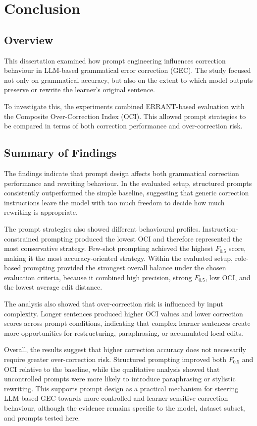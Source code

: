 \chapter{Conclusion}

\section{Overview}

This dissertation examined how prompt engineering influences correction behaviour in LLM-based grammatical error correction (GEC). The study focused not only on grammatical accuracy, but also on the extent to which model outputs preserve or rewrite the learner's original sentence.

To investigate this, the experiments combined ERRANT-based evaluation with the Composite Over-Correction Index (OCI). This allowed prompt strategies to be compared in terms of both correction performance and over-correction risk.

\section{Summary of Findings}

The findings indicate that prompt design affects both grammatical correction performance and rewriting behaviour. In the evaluated setup, structured prompts consistently outperformed the simple baseline, suggesting that generic correction instructions leave the model with too much freedom to decide how much rewriting is appropriate.

The prompt strategies also showed different behavioural profiles. Instruction-constrained prompting produced the lowest OCI and therefore represented the most conservative strategy. Few-shot prompting achieved the highest $F_{0.5}$ score, making it the most accuracy-oriented strategy. Within the evaluated setup, role-based prompting provided the strongest overall balance under the chosen evaluation criteria, because it combined high precision, strong $F_{0.5}$, low OCI, and the lowest average edit distance.

The analysis also showed that over-correction risk is influenced by input complexity. Longer sentences produced higher OCI values and lower correction scores across prompt conditions, indicating that complex learner sentences create more opportunities for restructuring, paraphrasing, or accumulated local edits.

Overall, the results suggest that higher correction accuracy does not necessarily require greater over-correction risk. Structured prompting improved both $F_{0.5}$ and OCI relative to the baseline, while the qualitative analysis showed that uncontrolled prompts were more likely to introduce paraphrasing or stylistic rewriting. This supports prompt design as a practical mechanism for steering LLM-based GEC towards more controlled and learner-sensitive correction behaviour, although the evidence remains specific to the model, dataset subset, and prompts tested here.

